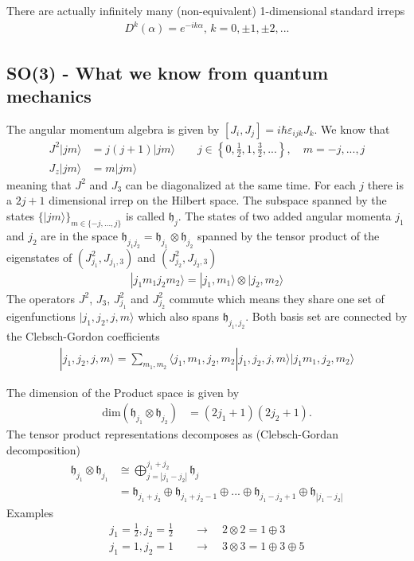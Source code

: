 \documentclass[10pt,a4paper]{book}
\theoremstyle{definition}
\begin{document}
There are actually infinitely many (non-equivalent) 1-dimensional standard irreps
\begin{align}
    D^{k}(\alpha)=e^{-ik\alpha},\,k=0,\pm1,\pm2,...
\end{align}

\subsection{SO(3) - What we know from quantum mechanics}
The angular momentum algebra is given by $[J_i,J_j]=i\hbar\varepsilon_{ijk}J_k$. We know that
\begin{align}
J^2|jm\rangle&=j(j+1)|jm\rangle\qquad j\in\left\{0,\frac{1}{2},1,\frac{3}{2},...\right\},\quad m=-j,...,j\\
J_z|jm\rangle&=m|jm\rangle
\end{align}
meaning that $J^2$ and $J_3$ can be diagonalized at the same time. For each $j$ there is a $2j+1$ dimensional 
irrep on the Hilbert space. The subspace spanned by the states $\{|jm\rangle\}_{m\in\{-j,...,j\}}$ 
is called $\mathfrak{h}_j$. The states of 
two added angular momenta $j_1$ and $j_2$ are in the space $\mathfrak{h}_{j_1j_2}=\mathfrak{h}_{j_1}\otimes\mathfrak{h}_{j_2}$ spanned by the tensor product of the eigenstates of $(J_{j_1}^2,J_{j_1,3})$ and $(J_{j_2}^2,J_{j_2,3})$
\begin{align}
|j_1m_1j_2m_2\rangle=|j_1,m_1\rangle\otimes|j_2,m_2\rangle
\end{align}
The operators $J^2$, $J_3$, $J_{j_1}^2$ and $J_{j_2}^2$ commute which means they share one set of eigenfunctions $|j_1,j_2,j,m\rangle$ which also spans $\mathfrak{h}_{j_1,j_2}$. Both basis set are connected by the Clebsch-Gordon coefficients
\begin{align}
|j_1,j_2,j,m\rangle=\sum_{m_1,m_2}\langle j_1,m_1,j_2,m_2|j_1,j_2,j,m\rangle|j_1m_1,j_2,m_2\rangle
\end{align}

The dimension of the Product space is given by
\begin{align}
\text{dim}(\mathfrak{h}_{j_1} \otimes \mathfrak{h}_{j_2})&=(2j_1+1)(2j_2+1).
\end{align}
The tensor product representations decomposes as ({\sc Clebsch-Gordan} decomposition)
\begin{align}
    \mathfrak{h}_{j_1} \otimes \mathfrak{h}_{j_1} &\cong \bigoplus_{j=|j_1-j_2|}^{j_1+j_2} \mathfrak{h}_{j}\\
    &=\mathfrak{h}_{j_1+j_2}\oplus \mathfrak{h}_{j_1+j_2-1}\oplus ... \oplus \mathfrak{h}_{j_1-j_2+1}\oplus \mathfrak{h}_{|j_1-j_2|}
\end{align}
Examples
\begin{align}
j_1=\frac{1}{2}, j_2=\frac{1}{2}&\quad\rightarrow\quad 2\otimes2=1\oplus3\\
j_1=1, j_2=1&\quad\rightarrow\quad 3\otimes3=1\oplus3\oplus5
\end{align}
\end{document}
